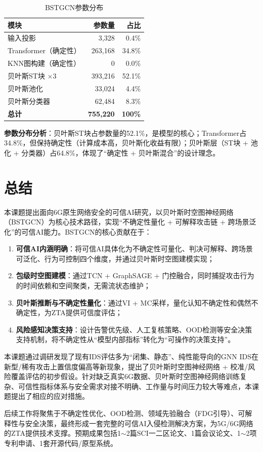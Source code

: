 \begin{table}[h]
\centering
\begin{tabular}{lrr}
\hline
\textbf{模块} & \textbf{参数量} & \textbf{占比} \\
\hline
输入投影 & 3,328 & 0.4\% \\
Transformer（确定性） & 263,168 & 34.8\% \\
KNN图构建（确定性） & 0 & 0.0\% \\
贝叶斯ST块 ×3 & 393,216 & 52.1\% \\
贝叶斯池化 & 33,024 & 4.4\% \\
贝叶斯分类器 & 62,484 & 8.3\% \\
\hline
\textbf{总计} & \textbf{755,220} & \textbf{100\%} \\
\hline
\end{tabular}
\caption{BSTGCN参数分布}
\end{table}

\textbf{参数分布分析}：贝叶斯ST块占参数量的52.1\%，是模型的核心；Transformer占34.8\%，但保持确定性（计算成本高，贝叶斯化收益有限）；贝叶斯层（ST块 + 池化 + 分类器）占64.8\%，体现了``确定性 + 贝叶斯混合''的设计理念。

\section{总结}

本课题提出面向6G原生网络安全的可信AI研究，以贝叶斯时空图神经网络（BSTGCN）为核心技术路径，实现``不确定性量化 + 可解释攻击链 + 跨场景泛化''的可信AI能力。BSTGCN的核心贡献在于：

\begin{enumerate}
  \item \textbf{可信AI内涵明确}：将可信AI具体化为不确定性可量化、判决可解释、跨场景可泛化、行为可控制四个维度，并通过贝叶斯时空图建模实现；
  \item \textbf{包级时空图建模}：通过TCN + GraphSAGE + 门控融合，同时捕捉攻击行为的时间依赖和空间聚类，无需流状态维护；
  \item \textbf{贝叶斯推断与不确定性量化}：通过VI + MC采样，量化认知不确定性和偶然不确定性，为ZTA提供可信度评估；
  \item \textbf{风险感知决策支持}：设计告警优先级、人工复核策略、OOD检测等安全决策支持机制，将不确定性从``模型内部指标''转化为``可操作的决策支持''。
\end{enumerate}

本课题通过调研发现了现有IDS评估多为``闭集、静态''、纯性能导向的GNN IDS在新型/稀有攻击上置信度偏高等新现象，提出了贝叶斯时空图神经网络 + 校准/风险覆盖评估的初步假设。针对缺乏真实6G数据、贝叶斯时空图神经网络训练复杂、可信性指标体系与安全需求对接不明确、工作量与时间压力较大等难点，本课题提出了相应的应对措施。

后续工作将聚焦于不确定性优化、OOD检测、领域先验融合（FDG引导）、可解释性与安全决策，最终形成一套完整的可信AI入侵检测解决方案，为5G/6G网络的ZTA提供技术支撑。预期成果包括1$\sim$2篇SCI一二区论文、1篇会议论文、1$\sim$2项专利申请、1套开源代码/原型系统。


